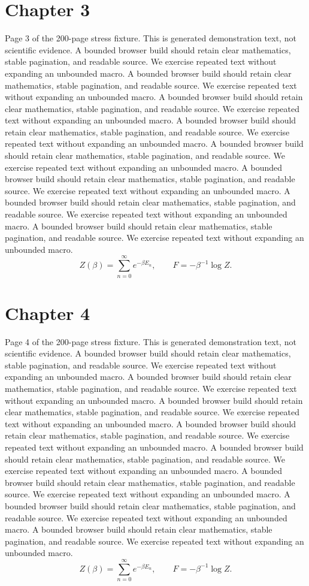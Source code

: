 \documentclass[11pt]{article}
\begin{document}
\section*{Chapter 3}
Page 3 of the 200-page stress fixture. This is generated demonstration text, not scientific evidence.
A bounded browser build should retain clear mathematics, stable pagination, and readable source. We exercise repeated text without expanding an unbounded macro.
A bounded browser build should retain clear mathematics, stable pagination, and readable source. We exercise repeated text without expanding an unbounded macro.
A bounded browser build should retain clear mathematics, stable pagination, and readable source. We exercise repeated text without expanding an unbounded macro.
A bounded browser build should retain clear mathematics, stable pagination, and readable source. We exercise repeated text without expanding an unbounded macro.
A bounded browser build should retain clear mathematics, stable pagination, and readable source. We exercise repeated text without expanding an unbounded macro.
A bounded browser build should retain clear mathematics, stable pagination, and readable source. We exercise repeated text without expanding an unbounded macro.
A bounded browser build should retain clear mathematics, stable pagination, and readable source. We exercise repeated text without expanding an unbounded macro.
A bounded browser build should retain clear mathematics, stable pagination, and readable source. We exercise repeated text without expanding an unbounded macro.
\[Z(\beta)=\sum_{n=0}^{\infty}e^{-\beta E_n},\qquad F=-\beta^{-1}\log Z.\]
\newpage
\section*{Chapter 4}
Page 4 of the 200-page stress fixture. This is generated demonstration text, not scientific evidence.
A bounded browser build should retain clear mathematics, stable pagination, and readable source. We exercise repeated text without expanding an unbounded macro.
A bounded browser build should retain clear mathematics, stable pagination, and readable source. We exercise repeated text without expanding an unbounded macro.
A bounded browser build should retain clear mathematics, stable pagination, and readable source. We exercise repeated text without expanding an unbounded macro.
A bounded browser build should retain clear mathematics, stable pagination, and readable source. We exercise repeated text without expanding an unbounded macro.
A bounded browser build should retain clear mathematics, stable pagination, and readable source. We exercise repeated text without expanding an unbounded macro.
A bounded browser build should retain clear mathematics, stable pagination, and readable source. We exercise repeated text without expanding an unbounded macro.
A bounded browser build should retain clear mathematics, stable pagination, and readable source. We exercise repeated text without expanding an unbounded macro.
A bounded browser build should retain clear mathematics, stable pagination, and readable source. We exercise repeated text without expanding an unbounded macro.
\[Z(\beta)=\sum_{n=0}^{\infty}e^{-\beta E_n},\qquad F=-\beta^{-1}\log Z.\]
\newpage
\end{document}

